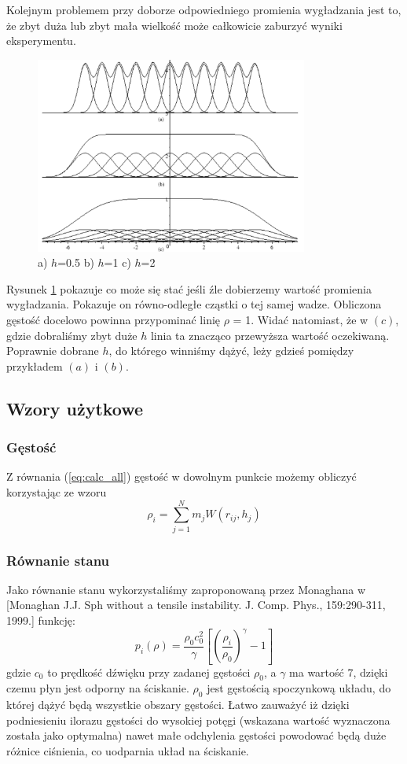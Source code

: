 \documentclass[polish, 12pt]{aghthesis}
\begin{document}
			Kolejnym problemem przy doborze odpowiedniego promienia wygładzania jest to, że zbyt duża lub zbyt mała wielkość może całkowicie zaburzyć wyniki eksperymentu.
			\begin{figure}[h!]
			\centering
			\includegraphics[width=0.8\textwidth]{smoothing.png}
			\caption{a) $h$=0.5 b) $h$=1 c) $h$=2}
			\label{fig:smoothing}
			\end{figure}
			Rysunek \ref{fig:smoothing} pokazuje co może się stać jeśli źle dobierzemy wartość promienia wygładzania. Pokazuje on równo-odległe cząstki o tej samej wadze. Obliczona gęstość docelowo powinna przypominać linię ${\rho}$ = 1. Widać natomiast, że w $(c)$, gdzie dobraliśmy zbyt duże $h$ linia ta znacząco przewyższa wartość oczekiwaną. Poprawnie dobrane $h$, do którego winniśmy dążyć, leży gdzieś pomiędzy przykładem $(a)$ i $(b)$.
			
		\subsection{Wzory użytkowe}
			\subsubsection{Gęstość}
			Z równania (\ref{eq:calc_all}) gęstość w dowolnym punkcie możemy obliczyć korzystając ze wzoru \[{\rho}_i=\sum_{j=1}^{N}m_jW(r_{ij},h_j) \label{eq:calc_density} \tag{8}\] 
			\subsubsection{Równanie stanu}
			Jako równanie stanu wykorzystaliśmy zaproponowaną przez Monaghana w [Monaghan J.J. Sph without a tensile instability. J. Comp. Phys., 159:290-311, 1999.] funkcję:
			\[p_i(\rho)=\frac{\rho_0 c_0^2}{\gamma}[(\frac{\rho_i}{\rho_0})^{\gamma} - 1] \label{eq:calc_state} \tag{8}\]
			gdzie ${c_0}$ to prędkość dźwięku przy zadanej gęstości ${\rho_0}$, a ${\gamma}$ ma wartość 7, dzięki czemu płyn jest odporny na ściskanie. $\rho_0$ jest gęstością spoczynkową układu, do której dążyć będą wszystkie obszary gęstości. Łatwo zauważyć iż dzięki podniesieniu ilorazu gęstości do wysokiej potęgi (wskazana wartość wyznaczona została jako optymalna) nawet małe odchylenia gęstości powodować będą duże różnice ciśnienia, co uodparnia układ na ściskanie.
			
\end{document}
